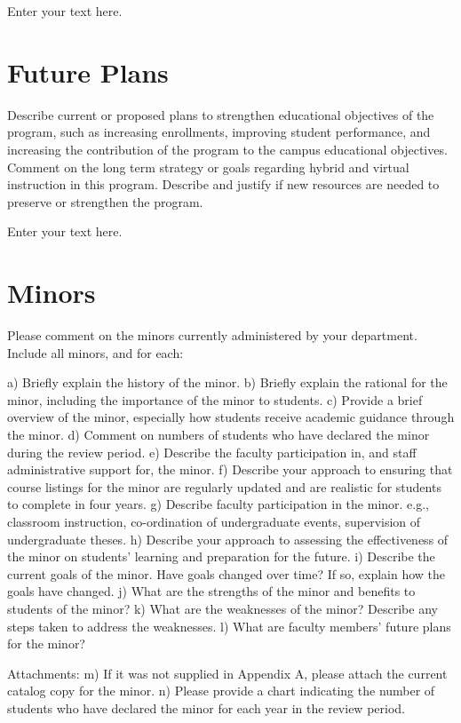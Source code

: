 \documentclass[12pt]{article}
\begin{document}
Enter your text here.

\section{Future Plans}
Describe current or proposed plans to strengthen educational objectives of the program, such as increasing enrollments, improving student performance, and increasing the contribution of the program to the campus educational objectives. Comment on the long term strategy or goals regarding hybrid and virtual instruction in this program. Describe and justify if new resources are needed to preserve or strengthen the program.

Enter your text here.

	
\section{Minors}
Please comment on the minors currently administered by your department. Include all minors, and for each:

    a) Briefly explain the history of the minor.
    b) Briefly explain the rational for the minor, including the importance of the minor to students.
    c) Provide a brief overview of the minor, especially how students receive academic
guidance through the minor.
    d) Comment on numbers of students who have declared the minor during the review period.
    e) Describe the faculty participation in, and staff administrative support for, the minor.
    f) Describe your approach to ensuring that course listings for the minor are regularly updated and are realistic for students to complete in four years.
    g) Describe faculty participation in the minor. e.g., classroom instruction, co-ordination of
undergraduate events, supervision of undergraduate theses.
    h) Describe your approach to assessing the effectiveness of the minor on students’ learning and preparation for the future.
    i) Describe the current goals of the minor. Have goals changed over time? If so, explain
how the goals have changed.
    j) What are the strengths of the minor and benefits to students of the minor?
    k) What are the weaknesses of the minor? Describe any steps taken to address the
weaknesses.
    l) What are faculty members’ future plans for the minor?

Attachments:
    m) If it was not supplied in Appendix A, please attach the current catalog copy for the minor.
    n) Please provide a chart indicating the number of students who have declared the minor for each year in the review period.
\end{document}
